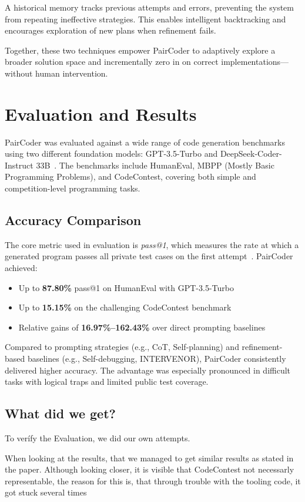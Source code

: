 \documentclass[11pt,a4paper]{article}
\begin{document}
A historical memory tracks previous attempts and errors, preventing the system from repeating ineffective strategies. This enables intelligent backtracking and encourages exploration of new plans when refinement fails.

Together, these two techniques empower PairCoder to adaptively explore a broader solution space and incrementally zero in on correct implementations—without human intervention.
\section{Evaluation and Results}
PairCoder was evaluated against a wide range of code generation benchmarks using two different foundation models: GPT-3.5-Turbo and DeepSeek-Coder-Instruct 33B~\cite{zhang2024paircoder}. The benchmarks include HumanEval, MBPP (Mostly Basic Programming Problems), and CodeContest, covering both simple and competition-level programming tasks.

\subsection{Accuracy Comparison}
The core metric used in evaluation is \textit{pass@1}, which measures the rate at which a generated program passes all private test cases on the first attempt~\cite{zhang2024paircoder}. PairCoder achieved:
\begin{itemize}
\item Up to \textbf{87.80\%} pass@1 on HumanEval with GPT-3.5-Turbo
\item Up to \textbf{15.15\%} on the challenging CodeContest benchmark
\item Relative gains of \textbf{16.97\%–162.43\%} over direct prompting baselines
\end{itemize}

Compared to prompting strategies (e.g., CoT, Self-planning) and refinement-based baselines (e.g., Self-debugging, INTERVENOR), PairCoder consistently delivered higher accuracy. The advantage was especially pronounced in difficult tasks with logical traps and limited public test coverage.

\subsection{What did we get?}

To verífy the Evaluation, we did our own attempts.




When looking at the results, that we managed to get similar results as stated in the paper.
Although looking closer, it is visible that CodeContest not necessarly representable, the reason for this is, that through trouble with the tooling code, it got stuck several times
\end{document}
